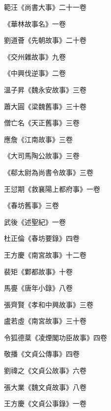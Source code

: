 \begin{pinyinscope}
 範汪《尚書大事》二十一卷



 《華林故事名》一卷



 劉道薈《先朝故事》二十卷



 《交州雜故事》九卷



 《中興伐逆事》二卷



 溫子昇《魏永安故事》三卷



 蕭大圓《梁魏舊事》三十卷



 僧亡名《天正舊事》三卷



 應詹《江南故事》三卷



 《大司馬陶公故事》三卷



 《郗太尉為尚書令故事》三卷



 王愆期《救襄陽上都府事》一卷



 《春坊舊事》三卷



 武後《述聖紀》一卷



 杜正倫《春坊要錄》四卷



 王方慶《南宮故事》十二卷



 裴矩《鄴都故事》十卷



 馬亹《唐年小錄》八卷



 張齊賢《孝和中興故事》三卷



 盧若虛《南宮故事》三十卷



 令狐德棻《凌煙閣功臣故事》四卷



 敬播《文貞公傳事》四卷



 劉禕之《文貞公故事》六卷



 張大業《魏文貞故事》八卷



 王方慶《文貞公事錄》一卷




\end{pinyinscope}
